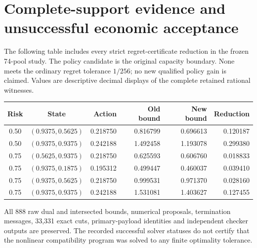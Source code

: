 \section{Complete-support evidence and unsuccessful economic acceptance}\label{dev:support126}
The following table includes every strict regret-certificate reduction in the frozen 74-pool study. The policy candidate is the original capacity boundary. None meets the ordinary regret tolerance $1/256$; no new qualified policy gain is claimed. Values are descriptive decimal displays of the complete retained rational witnesses.
\begin{center}\begin{tabular}{ccrrrr}\toprule
Risk & State & Action & Old bound & New bound & Reduction\\\midrule
0.50 & $(0.9375,0.5625)$ & 0.218750 & 0.816799 & 0.696613 & 0.120187 \\
0.50 & $(0.9375,0.9375)$ & 0.242188 & 1.492458 & 1.193078 & 0.299380 \\
0.75 & $(0.5625,0.9375)$ & 0.218750 & 0.625593 & 0.606760 & 0.018833 \\
0.75 & $(0.9375,0.1875)$ & 0.195312 & 0.499447 & 0.460037 & 0.039410 \\
0.75 & $(0.9375,0.5625)$ & 0.218750 & 0.999531 & 0.971370 & 0.028160 \\
0.75 & $(0.9375,0.9375)$ & 0.242188 & 1.531081 & 1.403627 & 0.127455 \\
\bottomrule\end{tabular}\end{center}
All 888 raw dual and intersected bounds, numerical proposals, termination messages, 33,331 exact cuts, primary-payload identities and independent checker outputs are preserved. The recorded successful solver statuses do not certify that the nonlinear compatibility program was solved to any finite optimality tolerance.
